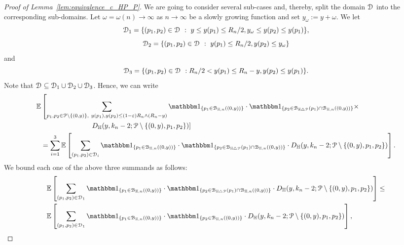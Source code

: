 \begin{proof}[Proof of Lemma~\ref{lem:equivalence_c_HP_P}]
We are going to consider several sub-cases and, thereby, split the domain $\mathcal{D}_{}$ into the corresponding sub-domains. 
Let $\omega =\omega (n) \to \infty$ as $n\to \infty$ be a slowly growing function and set $y_\omega := y +\omega$. 
We let $$\mathcal{D}_{1} =\{(p_1,p_2) \in \mathcal{D}_{} \ : \ y \leq y(p_1) \leq R_n/2, y_\omega \leq y(p_2) \leq y(p_1) \},$$ 
 $$\mathcal{D}_{2} = \{(p_1,p_2) \in \mathcal{D}_{} \ : \ y(p_1) \leq R_n/2, y(p_2) \leq y_\omega \}$$
and $$\mathcal{D}_{3} =  \{(p_1,p_2) \in \mathcal{D}_{} \ : R_n/2<y(p_1) \leq R_n -y, y(p_2) \leq y(p_1) \}.$$ 
Note that $\mathcal{D}_{} \subseteq \mathcal{D}_{1} \cup \mathcal{D}_{2}\cup \mathcal{D}_{3}$.
Hence, we can write 
\begin{equation} \label{eq:1sum-rewriting}
\begin{split} 
{\mathbb E}& \left[  \sum_{p_1, p_2\in \Pcal \setminus \{(0,y)\}, \ y(p_1), y(p_2) \leq (1-\eps) R_n\wedge (R_n-y)} \ind{p_1 \in \BallHyp{(0,y)}} \cdot \ind{p_2 \in \BallSym{p_1}\cap \BallHyp{(0,y)}} \times \right.\\ 
&\left. \hspace{2.5cm}  D_\H (y,k_n-2;\Pcal \setminus \{ (0,y),p_1,p_2\})  \right] \\ 
&=  \sum_{i=1}^3 {\mathbb E} \left[  \sum_{(p_1, p_2)\in \dom{i}} \ind{p_1 \in \BallHyp{(0,y)}} \cdot \ind{p_2 \in \BallSym{p_1}\cap \BallHyp{(0,y)}} \cdot D_\H (y,k_n-2;\Pcal \setminus \{ (0,y),p_1,p_2\})  \right].
\end{split}
\end{equation}
We bound each one of the above three summands as follows:  
\begin{equation} \label{eq:term1}
\begin{split}
&{\mathbb E} \left[  \sum_{(p_1, p_2)\in \dom{1}} \ind{p_1 \in \BallHyp{(0,y)}} \cdot \ind{p_2 \in \BallSym{p_1}\cap \BallHyp{(0,y)}} \cdot D_\H (y,k_n-2;\Pcal \setminus \{ (0,y),p_1,p_2\})  \right] \leq \\
& {\mathbb E} \left[  \sum_{(p_1, p_2)\in \dom{1}} \ind{p_1 \in \BallHyp{(0,y)}} \cdot \ind{p_2 \in  \BallHyp{(0,y)}} \cdot D_\H (y,k_n-2;\Pcal \setminus \{ (0,y),p_1,p_2\})  \right],
\end{split}
\end{equation}


\end{proof}
